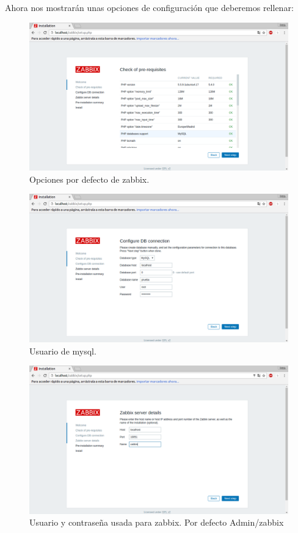 \begin{itemize}
	Ahora nos mostrarán unas opciones de configuración que deberemos rellenar:\\
	
	\begin{figure}[H]
	\centering
	\includegraphics[width=0.7\linewidth]{zabbix2}
	\caption[zabbix2]{Opciones por defecto de zabbix.}
	\label{fig:zabbix2}
	\end{figure}
	
	\begin{figure}[H]
	\centering
	\includegraphics[width=0.7\linewidth]{zabbix3}
	\caption[zabbix3]{Usuario de mysql.}
	\label{fig:zabbix3}
	\end{figure}
	
	\begin{figure}[H]
	\centering
	\includegraphics[width=0.7\linewidth]{zabbix4}
	\caption[zabbix4]{Usuario y contraseña usada para zabbix. Por defecto Admin/zabbix}
	\label{fig:zabbix4}
	\end{figure}
	

\end{itemize}
